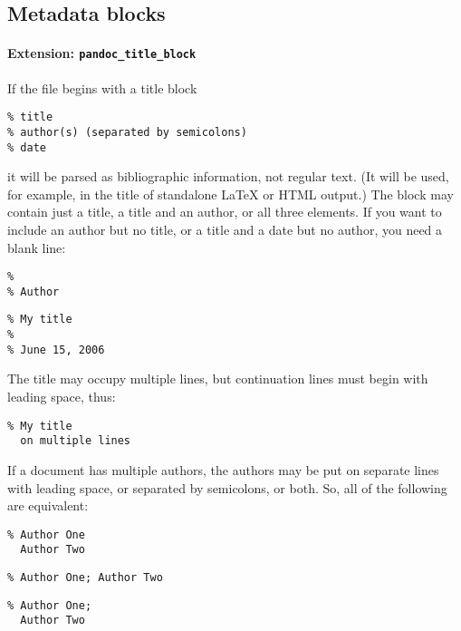 \documentclass[
  a4paper,
]{article}
\begin{document}
\hypertarget{metadata-blocks}{%
\subsection{Metadata blocks}\label{metadata-blocks}}

\hypertarget{extension-pandoc_title_block}{%
\paragraph{\texorpdfstring{Extension:
\texttt{pandoc\_title\_block}}{Extension: pandoc\_title\_block}}\label{extension-pandoc_title_block}}

If the file begins with a title block

\begin{verbatim}
% title
% author(s) (separated by semicolons)
% date
\end{verbatim}

it will be parsed as bibliographic information, not regular text. (It
will be used, for example, in the title of standalone LaTeX or HTML
output.) The block may contain just a title, a title and an author, or
all three elements. If you want to include an author but no title, or a
title and a date but no author, you need a blank line:

\begin{verbatim}
%
% Author
\end{verbatim}

\begin{verbatim}
% My title
%
% June 15, 2006
\end{verbatim}

The title may occupy multiple lines, but continuation lines must begin
with leading space, thus:

\begin{verbatim}
% My title
  on multiple lines
\end{verbatim}

If a document has multiple authors, the authors may be put on separate
lines with leading space, or separated by semicolons, or both. So, all
of the following are equivalent:

\begin{verbatim}
% Author One
  Author Two
\end{verbatim}

\begin{verbatim}
% Author One; Author Two
\end{verbatim}

\begin{verbatim}
% Author One;
  Author Two
\end{verbatim}
\end{document}
